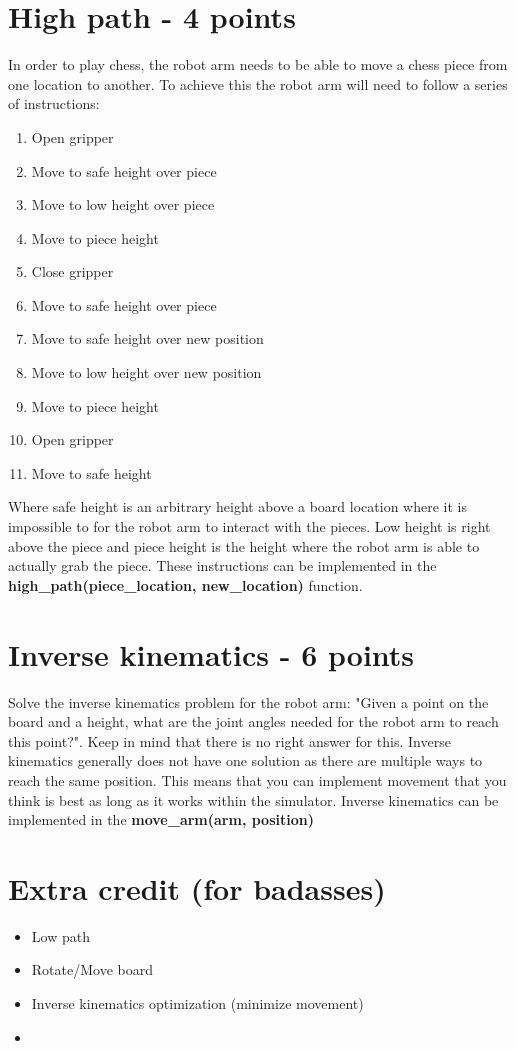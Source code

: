 \documentclass{article}
\begin{document}
\section*{High path - 4 points}
In order to play chess, the robot arm needs to be able to move a chess piece from one location to another. To achieve this the robot arm will need to follow a series of instructions:
\begin{enumerate}
\item Open gripper
\item Move to safe height over piece
\item Move to low height over piece
\item Move to piece height
\item Close gripper
\item Move to safe height over piece
\item Move to safe height over new position
\item Move to low height over new position
\item Move to piece height
\item Open gripper
\item Move to safe height
\end{enumerate}
Where safe height is an arbitrary height above a board location where it is impossible to for the robot arm to interact with the pieces. Low height is right above the piece and piece height is the height where the robot arm is able to actually grab the piece. These instructions can be implemented in the \textbf{high\_path(piece\_location, new\_location)} function.

\section*{Inverse kinematics - 6 points}
Solve the inverse kinematics problem for the robot arm: "Given a point on the board and a height, what are the joint angles needed for the robot arm to reach this point?". Keep in mind that there is no right answer for this. Inverse kinematics generally does not have one solution as there are multiple ways to reach the same position. This means that you can implement movement that you think is best as long as it works within the simulator. Inverse kinematics can be implemented in the \textbf{move\_arm(arm, position)}

\section*{Extra credit (for badasses)}
\begin{itemize}
    \item Low path
    \item Rotate/Move board
    \item Inverse kinematics optimization (minimize movement)
    \item 
\end{itemize}
\end{document}
